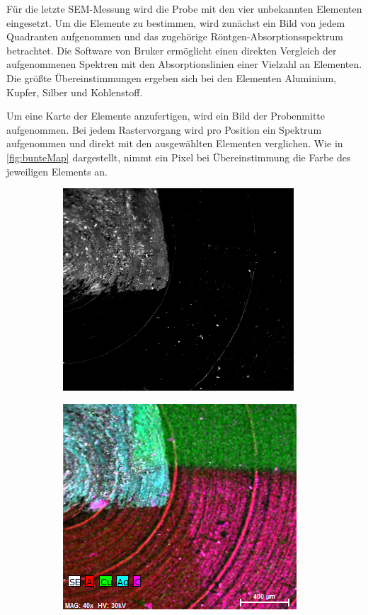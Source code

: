 	Für die letzte SEM-Messung wird die Probe mit den vier unbekannten Elementen eingesetzt.
	Um die Elemente zu bestimmen, wird zunächst ein Bild von jedem Quadranten aufgenommen und das zugehörige Röntgen-Absorptionsspektrum betrachtet.
	Die Software von Bruker ermöglicht einen direkten Vergleich der aufgenommenen Spektren mit den Absorptionslinien einer Vielzahl an Elementen.
	Die größte Übereinstimmungen ergeben sich bei den Elementen Aluminium, Kupfer, Silber und Kohlenstoff.

	Um eine Karte der Elemente anzufertigen, wird ein Bild der Probenmitte aufgenommen.
	Bei jedem Rastervorgang wird pro Position ein Spektrum aufgenommen und direkt mit den ausgewählten Elementen verglichen.
	Wie in \cref{fig:bunteMap} dargestellt, nimmt ein Pixel bei Übereinstimmung die Farbe des jeweiligen Elements an.
	\begin{figure}[H]
		\centering
		\begin{subfigure}[c]{.45\textwidth}
			\centering
			\includegraphics[width=.8\textwidth]{raw/SEM/Map4ProbenExt}
			\subcaption{}
			\label{fig:farbloseMap}
		\end{subfigure}
		\begin{subfigure}[c]{.45\textwidth}
			\centering
			\includegraphics[width=.8\textwidth]{raw/SEM/Mapdaten4Proben}

\end{subfigure}
\end{figure}
